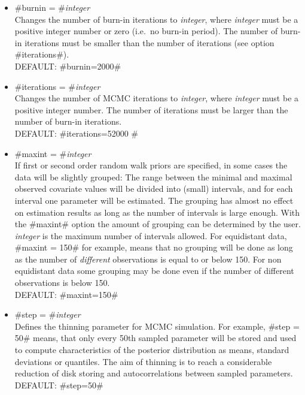 \begin{itemize}
\item #burnin = #{\em integer } \\
Changes the number of burn-in iterations to {\em integer}, where
{\em integer} must be a positive integer number or zero (i.e.~no
burn-in period).
The number of burn-in iterations must be smaller than the number of iterations (see option #iterations#). \\
DEFAULT: #burnin=2000#

\item #iterations = #{\em integer } \\
Changes the number of MCMC iterations to {\em integer}, where {\em
integer} must be a positive integer number. The number of
iterations must be larger than the
number of burn-in iterations. \\
DEFAULT: #iterations=52000 #


\item #maxint = #{\em integer } \\
If first or second order random walk priors are specified, in some
cases the data will be slightly grouped: The range between the
minimal and maximal observed covariate values will be divided into
(small) intervals, and for each interval one parameter will be
estimated. The grouping has almost no effect on estimation results
as long as the number of intervals is large enough. With the
#maxint# option the amount of grouping can be determined by the
user. {\em integer} is the maximum number of intervals allowed.
For equidistant data, #maxint = 150# for example, means that no
grouping will be done as long as the number of {\em different}
observations is equal to or below 150. For non equidistant
data some grouping may be done even if the number of different observations is below 150. \\
DEFAULT: #maxint=150#

\item #step = #{\em integer} \\
Defines the thinning parameter for MCMC simulation. For example,
#step = 50# means, that only every 50th sampled parameter will be
stored and used to compute characteristics of the posterior
distribution as means, standard deviations or quantiles. The aim
of thinning is to reach a considerable reduction of disk storing
and autocorrelations between sampled parameters.\\
DEFAULT: #step=50#

\end{itemize}

